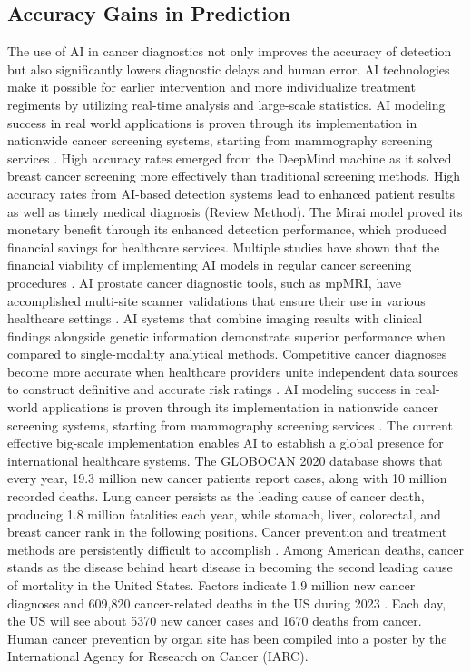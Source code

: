 \documentclass[conference]{IEEEtran}
\begin{document}
\subsection{Accuracy Gains in Prediction}
The use of AI in cancer diagnostics not only improves the accuracy of detection but also significantly lowers diagnostic delays and human error. AI technologies make it possible for earlier intervention and more individualize treatment regiments by utilizing real-time analysis and large-scale statistics. 
AI modeling success in real world applications is proven through its implementation in nationwide cancer screening systems, starting from mammography screening services \cite{11}.
High accuracy rates emerged from the DeepMind machine as it solved breast cancer screening more effectively than traditional screening methods. High accuracy rates from AI-based detection systems lead to enhanced patient results as well as timely medical diagnosis (Review Method).
The Mirai model proved its monetary benefit through its enhanced detection performance, which produced financial savings for healthcare services. Multiple studies have shown that the financial viability of implementing AI models in regular cancer screening procedures \cite{10}.
AI prostate cancer diagnostic tools, such as mpMRI, have accomplished multi-site scanner validations that ensure their use in various healthcare settings \cite{6}.
AI systems that combine imaging results with clinical findings alongside genetic information demonstrate superior performance when compared to single-modality analytical methods. Competitive cancer diagnoses become more accurate when healthcare providers unite independent data sources to construct definitive and accurate risk ratings \cite{4,7,12}.
AI modeling success in real-world applications is proven through its implementation in nationwide cancer screening systems, starting from mammography screening services \cite{11}. The current effective big-scale implementation enables AI to establish a global presence for international healthcare systems.
The GLOBOCAN 2020 database shows that every year, 19.3 million new cancer patients report cases, along with 10 million recorded deaths. Lung cancer persists as the leading cause of cancer death, producing 1.8 million fatalities each year, while stomach, liver, colorectal, and breast cancer rank in the following positions. Cancer prevention and treatment methods are persistently difficult to accomplish \cite{13}. Among American deaths, cancer stands as the disease behind heart disease in becoming the second leading cause of mortality in the United States. Factors indicate 1.9 million new cancer diagnoses and 609,820 cancer-related deaths in the US during 2023 \cite{14}. Each day, the US will see about 5370 new cancer cases and 1670 deaths from cancer. Human cancer prevention by organ site has been compiled into a poster by the International Agency for Research on Cancer (IARC).
\end{document}
